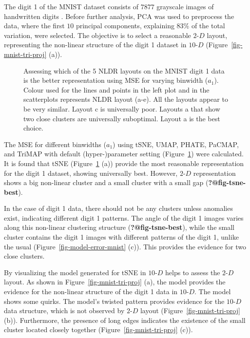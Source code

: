 \documentclass[
  12pt]{article}
\newcommand\gD{$2\text{-}D$}
\begin{document}
The digit 1 of the MNIST dataset consists of \(7877\) grayscale images
of handwritten digits \citep{lecun2010}. Before further analysis, PCA
was used to preprocess the data, where the first \(10\) principal
components, explaining 83\% of the total variation, were selected. The
objective is to select a reasonable \gD{} layout, representing the
non-linear structure of the digit 1 dataset in \(10\text{-}D\)
(Figure~\ref{fig-mnist-tri-proj} (a)).

\begin{figure}[H]


\caption{\label{fig-mnist-mse}Assessing which of the 5 NLDR layouts on
the MNIST digit 1 data is the better representation using MSE for
varying binwidth (\(a_1\)). Colour used for the lines and points in the
left plot and in the scatterplots represents NLDR layout (a-e). All the
layouts appear to be very similar. Layout c is universally poor. Layouts
a that show two close clusters are universally suboptimal. Layout a is
the best choice.}

\end{figure}%

The MSE for different binwidths (\(a_1\)) using tSNE, UMAP, PHATE,
PaCMAP, and TriMAP with default (hyper-)parameter setting
(Figure~\ref{fig-mnist-mse}) were calculated. It is found that tSNE
(Figure~\ref{fig-mnist-mse} (a)) provide the most reasonable
representation for the digit 1 dataset, showing universally best.
However, \gD{} representation shows a big non-linear cluster and a small
cluster with a small gap (\textbf{?@fig-tsne-best}).

In the case of digit 1 data, there should not be any clusters unless
anomalies exist, indicating different digit 1 patterns. The angle of the
digit 1 images varies along this non-linear clustering structure
(\textbf{?@fig-tsne-best}), while the small cluster contains the digit 1
images with different patterns of the digit 1, unlike the usual
(Figure~\ref{fig-model-error-mnist} (c)). This provides the evidence for
two close clusters.

By visualizing the model generated for tSNE in \(10\text{-}D\) helps to
assess the \gD{} layout. As shown in Figure~\ref{fig-mnist-tri-proj}
(a), the model provides the evidence for the non-linear structure of the
digit 1 data in \(10\text{-}D\). The model shows some quirks. The
model's twisted pattern provides evidence for the \(10\text{-}D\) data
structure, which is not observed by \gD{} layout
(Figure~\ref{fig-mnist-tri-proj} (b)). Furthermore, the presence of long
edges indicates the existence of the small cluster located closely
together (Figure~\ref{fig-mnist-tri-proj} (c)).
\end{document}
